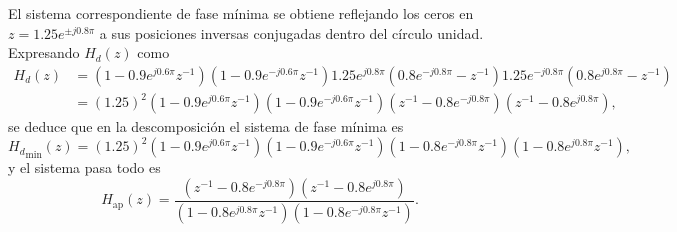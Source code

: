 \documentclass[a4paper]{report}
\begin{document}
El sistema correspondiente de fase mínima se obtiene reflejando los ceros en \(z=1.25e^{\pm j0.8\pi}\) a sus posiciones inversas conjugadas dentro del círculo unidad. Expresando \(H_d(z)\) como
\begin{align*}
 H_d(z)&=(1-0.9e^{j0.6\pi}z^{-1})(1-0.9e^{-j0.6\pi}z^{-1})1.25e^{j0.8\pi}(0.8e^{-j0.8\pi}-z^{-1})1.25e^{-j0.8\pi}(0.8e^{j0.8\pi}-z^{-1})\\
  &=(1.25)^2(1-0.9e^{j0.6\pi}z^{-1})(1-0.9e^{-j0.6\pi}z^{-1})(z^{-1}-0.8e^{-j0.8\pi})(z^{-1}-0.8e^{j0.8\pi}),
\end{align*}
se deduce que en la descomposición el sistema de fase mínima es
\begin{equation}\label{eq:transform_analysis_example_5_13_H_min}
 {H_d}_\textrm{min}(z)=(1.25)^2(1-0.9e^{j0.6\pi}z^{-1})(1-0.9e^{-j0.6\pi}z^{-1})(1-0.8e^{-j0.8\pi}z^{-1})(1-0.8e^{j0.8\pi}z^{-1}),
 \end{equation}
y el sistema pasa todo es
\begin{equation}\label{eq:transform_analysis_example_5_13_H_ap}
 H_\textrm{ap}(z)=\frac{(z^{-1}-0.8e^{-j0.8\pi})(z^{-1}-0.8e^{j0.8\pi})}{(1-0.8e^{j0.8\pi}z^{-1})(1-0.8e^{-j0.8\pi}z^{-1})}. 
\end{equation}
\end{document}
